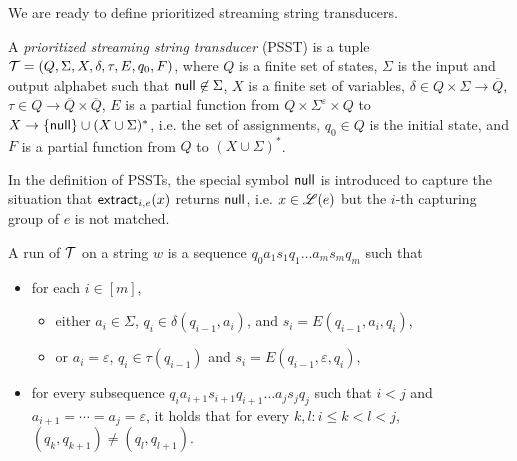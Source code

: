 We are ready to define prioritized streaming string transducers. 
  
\begin{definition}
A \emph{prioritized streaming string transducer} (PSST) is a tuple $\mathcal{T} = (Q, \Sigma, X, \delta, \tau, E, q_0, F)$, where $Q$ is a
finite set of states, $\Sigma$ is the input and output alphabet such that $\mathsf{null} \not \in \Sigma$, $X$ is a finite set of variables, $\delta \in Q \times \Sigma \rightarrow \overline{Q}$, $\tau \in Q \rightarrow \overline{Q} \times \overline{Q}$, $E$ is a partial function from $Q \times \Sigma^\varepsilon \times
  Q$ to $X \rightarrow \{\mathsf{null}\} \cup (X \cup \Sigma)^{\ast}$, i.e. the set of assignments,
   $q_0 \in Q$ is the initial state, and $F$ is a partial function
  from $Q$ to $(X \cup \Sigma)^{\ast}$.
\end{definition}
In the definition of PSSTs, the special symbol $\mathsf{null}$ is introduced to capture the situation that $\mathsf{extract}_{i,e}(x)$ returns $\mathsf{null}$, i.e. $x \in \mathscr{L}(e)$ but the $i$-th capturing group of $e$ is not matched.

A run of $\mathcal{T}$ on a string $w$ is a sequence $q_0 a_1 s_1 q_1 \ldots a_m s_m q_m$ such that
\begin{itemize}
%
\item for each $i \in [m]$, 
\begin{itemize}
\item either $a_i \in \Sigma$, $q_i \in \delta (q_{i-1}, a_i)$, and $s_i = E (q_{i - 1}, a_i, q_i)$, 
\item or $a_i = \varepsilon$, $q_i \in \tau(q_{i-1})$ and $s_i = E (q_{i - 1}, \varepsilon, q_i)$,
\end{itemize}

\item for every subsequence $q_i a_{i+1} s_{i+1} q_{i+1} \ldots a_{j} s_j q_j$ such that  $i < j$ and $a_{i+1} = \cdots = a_j = \varepsilon$,  it holds that for every $k, l: i \le k < l < j$, $(q_k, q_{k+1}) \neq (q_l, q_{l+1})$.
\end{itemize}

